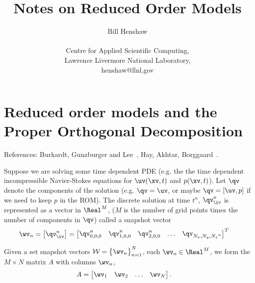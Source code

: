 \documentclass[11pt]{article}
\newcommand{\Wc}{\mathcal{W}}
\newcommand{\mysection}{\section}
\begin{document}
 
\title{Notes on Reduced Order Models}

\author{
Bill Henshaw \\
\  \\
Centre for Applied Scientific Computing, \\
Lawrence Livermore National Laboratory, \\
henshaw@llnl.gov }
 
\maketitle

\tableofcontents

\clearpage 
\mysection{Reduced order models and the Proper Orthogonal Decomposition}

References: Burkardt, Gunzburger and Lee~\cite{BurkardtGunzburgerLee2006},
Hay, Akhtar, Borggaard~\cite{HayAkhtarBorggaard2012}. 


Suppose we are solving some time dependent PDE (e.g. the 
the time dependent incompressible Navier-Stokes equations for $\uv(\xv,t)$ and $p(\xv,t)$).
Let $\qv$ denote the components of the solution (e.g. $\qv=\uv$, or maybe $\qv=[\uv, p]$ if we need to keep $p$ in the ROM).
The discrete solution at time $t^n$, $\qv_\iv^n$ is represented as a vector in $\Real^M$, ($M$ is the number of grid points times the
number of components in $\qv$)
called a snapshot vector
\begin{align*}
   \wv_n &= \begin{bmatrix}
              \qv_\iv^n 
            \end{bmatrix} 
         = \begin{bmatrix}
              \qv_{0,0,0}^n & \qv_{1,0,0}^n & \qv_{2,0,0}^n & \ldots & \qv_{{N_x},{N_y},{N_z}^n}   
            \end{bmatrix}^T
\end{align*}




Given a set snapshot vectors $\Wc = \big\{ \wv_n\big\}_{n=1}^N$, each $\wv_n \in \Real^M$, we form the
$M\times N$ matrix $A$ with columns $\wv_n$, 
\begin{align*}
   A &= \begin{bmatrix} \wv_1 & \wv_2 & \ldots & \wv_N \end{bmatrix}.
\end{align*}
\end{document}
